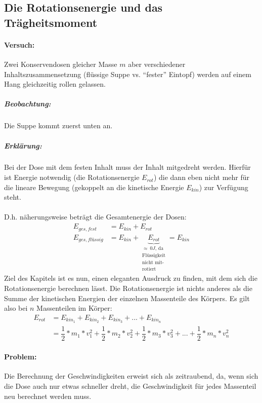 \documentclass[12pt]{article}
\numberwithin{equation}{subsection}
\begin{document}
	\subsection{Die Rotationsenergie und das Trägheitsmoment}
	\paragraph{Versuch:}
	Zwei Konservendosen gleicher Masse $ m $ aber verschiedener Inhaltszusammensetzung (flüssige Suppe vs. ``fester'' Eintopf) werden auf einem Hang gleichzeitig rollen gelassen.
	\subparagraph{Beobachtung:}
	Die Suppe kommt zuerst unten an.
	\subparagraph{Erklärung:}
	Bei der Dose mit dem festen Inhalt muss der Inhalt mitgedreht werden. Hierfür ist Energie notwendig (die Rotationsenergie $ E_{rot} $) die dann eben nicht mehr für die lineare Bewegung (gekoppelt an die kinetische Energie $ E_{kin} $) zur Verfügung steht.\\\\
	D.h. näherungsweise beträgt die Gesamtenergie der Dosen:
	\begin{align}
		E_{ges, fest} &= E_{kin}+E_{rot}\\
		E_{ges, fl\textit{\"u}ssig} &= E_{kin}+\underbrace{E_{rot}}_{\substack{\approx \ 0J\text{, da}\\\text{Flüssigkeit} \\ \text{nicht mit-}\\\text{rotiert}}} = E_{kin}
	\end{align}
	Ziel des Kapitels ist es nun, einen eleganten Ausdruck zu finden, mit dem sich die Rotationsenergie berechnen lässt.
	Die Rotationsenergie ist nichts anderes als die Summe der kinetischen Energien der einzelnen Massenteile des Körpers. Es gilt also bei $ n $ Massenteilen im Körper:
	\begin{align}
		E_{rot} &= E_{kin_1}+E_{kin_2}+E_{kin_3}+...+E_{kin_n}\\
		&= \dfrac{1}{2}*m_1*v_1^2+\dfrac{1}{2}*m_2*v_2^2+\dfrac{1}{2}*m_3*v_3^2+...+\dfrac{1}{2}*m_n*v_n^2
	\end{align}
	\paragraph{Problem:}
	Die Berechnung der Geschwindigkeiten erweist sich als zeitraubend, da, wenn sich die Dose auch nur etwas schneller dreht, die Geschwindigkeit für jedes Massenteil neu berechnet werden muss.
\end{document}
